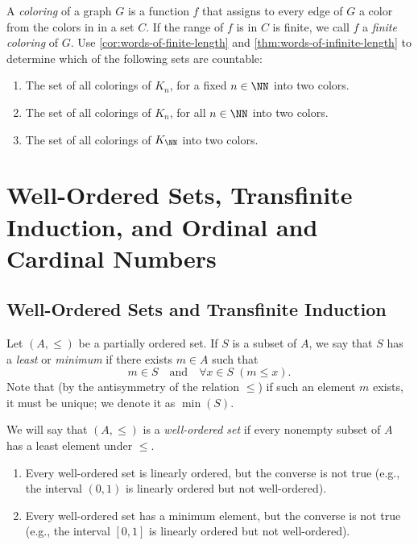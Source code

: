 \begin{exercises}
A \emph{coloring} of a graph $G$ is a function $f$ that assigns to every edge of $G$ a color from the colors in in a set $C$.
If the range of $f$ is in $C$ is finite, we call $f$ a \emph{finite coloring} of $G$.
Use \cref{cor:words-of-finite-length} and \cref{thm:words-of-infinite-length} to determine which of the following sets are countable:
\begin{enumerate}
\item
  The set of all colorings of $K_n$, for a fixed $n\in\NN$ into two colors.
\item
  The set of all colorings of $K_n$, for all  $n\in\NN$ into two colors.
\item
  The set of all colorings of $K_{\NN}$ into two colors.
\end{enumerate}

\end{exercises}

\section{Well-Ordered Sets, Transfinite Induction, and Ordinal and Cardinal Numbers}

\subsection{Well-Ordered Sets and Transfinite Induction \nopunct}

\begin{definition}
  Let $(A,\le)$ be a partially ordered set.
  If $S$ is a subset of $A$, we say that $S$ has a \emph{least} or \emph{minimum}  if there exists $m\in A$ such that
  \[
    m\in S
    \quad\text{and}\quad
    \forall x\in S \; (m\le x).
  \]
  Note that (by the antisymmetry of the relation $\le$) if such an element $m$ exists, it must be unique;
  we denote it as $\min (S)$.

  We will say that $(A,\le)$ is a \emph{well-ordered set} if every nonempty subset of $A$ has a least element under $\leq$.
\end{definition}

\begin{remarks}
  \begin{enumerate}
  \item
    Every well-ordered set is linearly ordered, but the converse is not true (e.g., the interval $(0,1)$ is linearly ordered but not well-ordered).
  \item
    Every well-ordered set has a minimum element, but the converse is not true (e.g., the interval $[0,1]$ is linearly ordered but not well-ordered).
  \end{enumerate}
\end{remarks}


